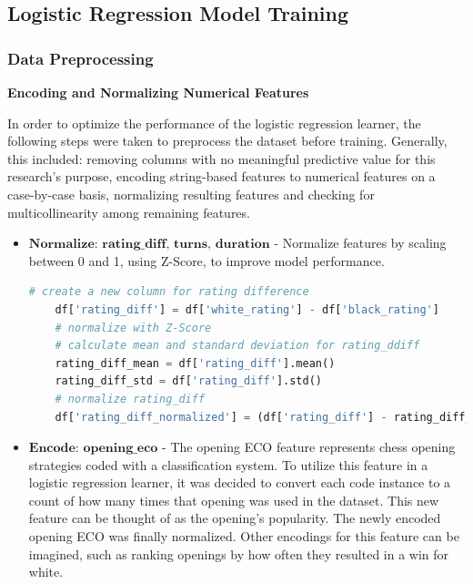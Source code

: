 \documentclass[12pt]{article}
\begin{document}
\subsection{Logistic Regression Model Training}

\subsubsection{Data Preprocessing}

\noindent\textbf{Encoding and Normalizing Numerical Features}

In order to optimize the performance of the logistic regression learner, the following steps were taken to preprocess the dataset before training. Generally, this included: removing columns with no meaningful predictive value for this research's purpose, encoding string-based features to numerical features on a case-by-case basis, normalizing resulting features and checking for multicollinearity among remaining features.


\begin{itemize}[label={}, leftmargin=0pt]
  \item $\textbf{Normalize: rating\_diff, turns, duration}$ - Normalize features by scaling between 0 and 1, using Z-Score, to improve model performance.

  \begin{lstlisting}[language=Python, caption={example: normalizing ratings}]
    # create a new column for rating difference
    df['rating_diff'] = df['white_rating'] - df['black_rating']
    # normalize with Z-Score
    # calculate mean and standard deviation for rating_ddiff
    rating_diff_mean = df['rating_diff'].mean()
    rating_diff_std = df['rating_diff'].std()
    # normalize rating_diff
    df['rating_diff_normalized'] = (df['rating_diff'] - rating_diff_mean) / rating_diff_std
  \end{lstlisting}

  \item $\textbf{Encode: opening\_eco}$ - The opening ECO feature represents chess opening strategies coded with a classification system. To utilize this feature in a logistic regression learner, it was decided to convert each code instance to a count of how many times that opening was used in the dataset. This new feature can be thought of as the opening's popularity. The newly encoded opening ECO was finally normalized. Other encodings for this feature can be imagined, such as ranking openings by how often they resulted in a win for white.
\end{itemize}
\end{document}
